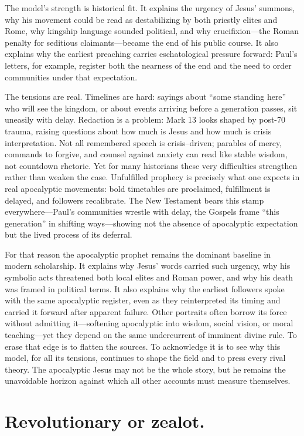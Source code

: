 The model’s strength is historical fit.
It explains the urgency of Jesus’ summons, why his movement could be read as destabilizing by both priestly elites and Rome, why kingship language sounded political, and why crucifixion—the Roman penalty for seditious claimants—became the end of his public course.
It also explains why the earliest preaching carries eschatological pressure forward: Paul’s letters, for example, register both the nearness of the end and the need to order communities under that expectation.

The tensions are real.
Timelines are hard: sayings about “some standing here” who will see the kingdom, or about events arriving before a generation passes, sit uneasily with delay.
Redaction is a problem: Mark 13 looks shaped by post-70 trauma, raising questions about how much is Jesus and how much is crisis interpretation.
Not all remembered speech is crisis–driven; parables of mercy, commands to forgive, and counsel against anxiety can read like stable wisdom, not countdown rhetoric.
Yet for many historians these very difficulties strengthen rather than weaken the case.
Unfulfilled prophecy is precisely what one expects in real apocalyptic movements: bold timetables are proclaimed, fulfillment is delayed, and followers recalibrate.
The New Testament bears this stamp everywhere—Paul’s communities wrestle with delay, the Gospels frame “this generation” in shifting ways—showing not the absence of apocalyptic expectation but the lived process of its deferral.

For that reason the apocalyptic prophet remains the dominant baseline in modern scholarship.
It explains why Jesus’ words carried such urgency, why his symbolic acts threatened both local elites and Roman power, and why his death was framed in political terms.
It also explains why the earliest followers spoke with the same apocalyptic register, even as they reinterpreted its timing and carried it forward after apparent failure.
Other portraits often borrow its force without admitting it—softening apocalyptic into wisdom, social vision, or moral teaching—yet they depend on the same undercurrent of imminent divine rule.
To erase that edge is to flatten the sources.
To acknowledge it is to see why this model, for all its tensions, continues to shape the field and to press every rival theory.
The apocalyptic Jesus may not be the whole story, but he remains the unavoidable horizon against which all other accounts must measure themselves.

\section{Revolutionary or zealot.}\label{sec:revolutionary}

